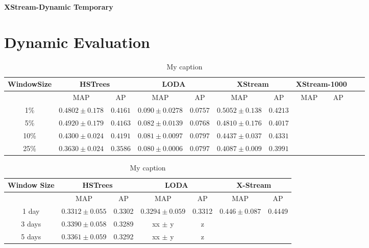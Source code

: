 \documentclass[11pt,onecolumn]{article}
\begin{document}
\textbf{\huge{XStream-Dynamic Temporary}}

\section{Dynamic Evaluation}

\begin{table}[!hbtp]
    \centering
    \begin{tabular}{|c|c|c|c|c|c|c|c|c|c|c|}
            \toprule
    \textbf{WindowSize} & \multicolumn{2}{|c|}{\textbf{HSTrees}} & \multicolumn{2}{|c|}{\textbf{LODA}} & \multicolumn{2}{|c|}{\textbf{XStream}} & \multicolumn{2}{|c|}{\textbf{XStream-1000}} \\	\hline
                & MAP               & AP      & MAP              & AP     & MAP               & AP       & MAP & AP	\\
                \midrule \midrule
    1\%  & $0.4802 \pm 0.178$ & $0.4161$ & $0.090 \pm 0.0278$ & $0.0757$ & $0.5052 \pm 0.138$ & $0.4213$ 	& & \\	\hline
    5\% & $0.4920 \pm 0.179$ & $0.4163$ & $0.082 \pm 0.0139$ & $0.0768$ & $0.4810 \pm 0.176$ & $0.4017$ & &	\\	\hline
    10\% & $0.4300 \pm 0.024$ & $0.4191$ & $0.081 \pm 0.0097$ & $0.0797$ & $0.4437 \pm 0.037$ & $0.4331$ & &	\\	\hline
    25\% & $0.3630 \pm 0.024$ & $0.3586$ & $0.080 \pm 0.0006$ & $0.0797$ & $0.4087 \pm 0.009$ & $0.3991$	\\	\hline
    \bottomrule
    \end{tabular}
    \caption{My caption}
\label{my-label}
\end{table}

\begin{table}[]
\centering
\begin{tabular}{|c|c|c|c|c|c|c|}
\toprule
\textbf{Window Size} & \multicolumn{2}{|c|}{\textbf{HSTrees}} & \multicolumn{2}{|c|}{\textbf{LODA}}  & \multicolumn{2}{|c|}{\textbf{X-Stream}} \\ \hline\midrule
            & MAP               & AP      & MAP              & AP     & MAP               & AP       \\
            \midrule\midrule
1 day       & $0.3312 \pm 0.055$  & 0.3302  & $0.3294 \pm 0.059$ & 0.3312 & $0.446 \pm 0.087$   & 0.4449   \\	\hline
3 days      & $0.3390 \pm 0.058$ & 0.3289 & xx $\pm$ y &   z      &       &          \\
5 days      & $0.3361 \pm 0.059$ & 0.3292 &   xx $\pm$ y & z  & &          \\	
\bottomrule
\end{tabular}
\caption{My caption}
\label{my-label}
\end{table}



\printbibliography
\end{document}
